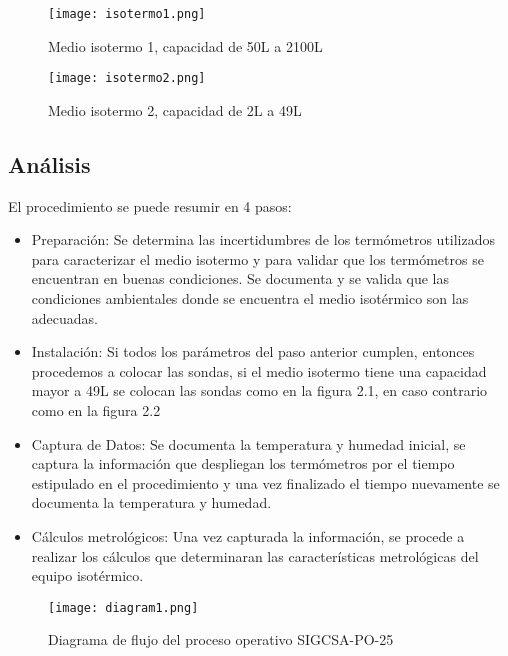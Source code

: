 \begin{figure}[H]
	\centering
	\texttt{[image: isotermo1.png]}
	\caption{Medio isotermo 1, capacidad de 50L a 2100L}
\end{figure}

\begin{figure}[H]
	\centering
	\texttt{[image: isotermo2.png]}
	\caption{Medio isotermo 2, capacidad de 2L a 49L}
\end{figure}
	
\subsection{Análisis}


\par \noindent
El procedimiento se puede resumir en 4 pasos:

\begin{itemize}
	\item Preparación: Se determina las incertidumbres de los termómetros utilizados para caracterizar el medio isotermo y para validar que los termómetros se encuentran en buenas condiciones. Se documenta y se valida que las condiciones ambientales donde se encuentra el medio isotérmico son las adecuadas.
	
	\item Instalación: Si todos los parámetros del paso anterior cumplen, entonces procedemos a colocar las sondas, si el medio isotermo tiene una capacidad mayor a 49L se colocan las sondas como en la figura 2.1, en caso contrario como en la figura 2.2
	
	\item Captura de Datos: Se documenta la temperatura y humedad inicial, se captura la información que despliegan los termómetros por el tiempo estipulado en el procedimiento y una vez finalizado el tiempo nuevamente se documenta la temperatura y humedad.
	
	\item Cálculos metrológicos: Una vez capturada la información, se procede a realizar los cálculos que determinaran las características metrológicas del equipo isotérmico. 
\end{itemize}

\begin{figure}[H]
	\centering
	\texttt{[image: diagram1.png]}
	\caption{Diagrama de flujo del proceso operativo SIGCSA-PO-25}
\end{figure}
